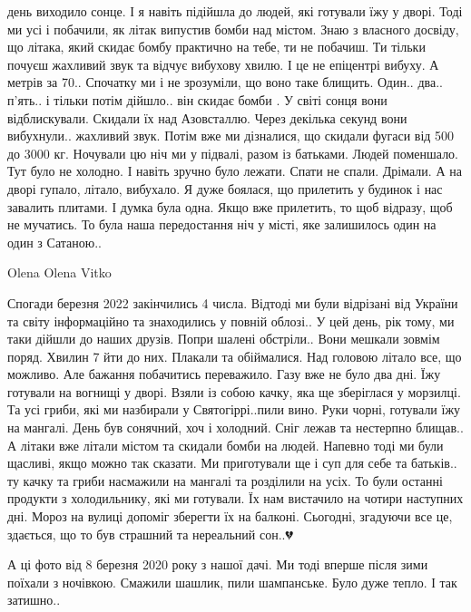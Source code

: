 день виходило сонце. І я навіть підійшла до людей, які готували їжу у дворі.
Тоді ми усі і  побачили, як літак випустив бомби над містом. Знаю з власного
досвіду, що літака, який скидає бомбу практично на тебе, ти не побачиш.  Ти
тільки почуєш жахливий звук та відчує вибухову хвилю. І це не епіцентрі вибуху.
А метрів за 70..   Спочатку ми і не зрозуміли, що воно таке блищить. Один..
два.. п'ять.. і тільки потім дійшло.. він скидає бомби . У світі сонця вони
відблискували.  Скидали їх над Азовсталлю.  Через декілька секунд вони
вибухнули.. жахливий звук. Потім вже ми дізналися, що скидали фугаси від 500 до
3000 кг. Ночували цю ніч ми у підвалі,  разом із  батьками. Людей  поменшало.
Тут було не холодно.  І навіть зручно було лежати. Спати не спали. Дрімали. А
на дворі гупало, літало, вибухало.  Я дуже боялася, що прилетить у будинок і
нас завалить плитами. І думка була одна. Якщо вже прилетить, то щоб відразу,
щоб не мучатись.  То була наша передостання ніч у місті, яке залишилось один на
один з Сатаною..

Olena
Olena Vitko


Спогади березня 2022 закінчились 4 числа. Відтоді ми були відрізані від України
та світу інформаційно та знаходились у повній облозі.. У цей день, рік тому, ми
таки дійшли до наших друзів. Попри шалені обстріли.. Вони мешкали зовмім поряд.
Хвилин 7 йти до них. Плакали та обіймалися.  Над головою літало все, що
можливо. Але бажання побачитись переважило.  Газу вже не було два дні. Їжу
готували на вогнищі у дворі.  Взяли із собою качку, яка ще зберіглася у
морзилці. Та усі гриби, які ми назбирали у Святогіррі..пили вино. Руки чорні,
готували їжу на мангалі.  День був сонячний, хоч і холодний.  Сніг лежав та
нестерпно блищав.. А літаки вже літали містом та скидали бомби на людей.
Напевно тоді ми були щасливі, якщо можно так сказати.  Ми приготували ще і суп
для себе та батьків.. ту качку та гриби насмажили на мангалі та розділили на
усіх. То були останні продукти з холодильнику, які ми готували. Їх нам
вистачило на чотири наступних дні. Мороз на вулиці допоміг зберегти їх на
балконі.  Сьогодні, згадуючи все це, здається, що то був страшний та нереальний
сон..💔

А ці фото від 8 березня  2020 року з нашої дачі. Ми тоді вперше після зими
поїхали з ночівкою. Смажили шашлик, пили шампанське.  Було дуже тепло. І так
затишно..
